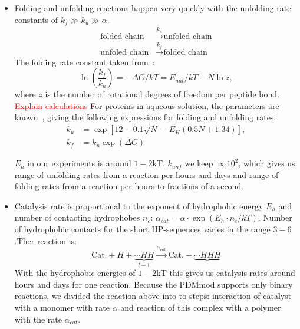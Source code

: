 \documentclass[journal=jacsat,manuscript=article,layout=twocolumn]{achemso}
\newcommand*{\ga}{\alpha}
\newcommand*{\gD}{\Delta}
\newcommand*{\pt}[1]{\left( #1\right)}
\newcommand*{\red}[1]{\textcolor{red}{#1}}
\begin{document}
\begin{itemize}
\item Folding and unfolding reactions happen very quickly with 
the unfolding rate constants of $k_f\gg k_{u}\gg\ga$. 
\begin{equation}
\begin{split}
 \mbox{folded chain}&\xrightarrow{k_u}\mbox{unfoled chain}  \\
 \mbox{unfoled chain}&\xrightarrow{k_f}\mbox{folded chain}
\end{split}
\end{equation}
The folding rate constant taken 
from~\cite{Ghosh2009}:
\begin{equation}
 \ln\pt{\frac{k_f}{k_u}}=-\gD G/kT = E_{nat}/kT-N\ln z,
\end{equation} 
 where $z$ is the number of rotational degrees of freedom per peptide bond. 
 \red{Explain calculations}
For proteins in aqueous solution, the parameters are known~\cite{Ghosh2010,Dill2011}, 
giving the following expressions for folding and unfolding rates:
\begin{equation}
\begin{split}
  k_u &= \exp[12-0.1 \sqrt{N} -E_H(0.5 N + 1.34)],\\
  k_f &= k_u\exp(\gD G)
\end{split}
\end{equation}

$E_h$ in our experiments is around $1-2$kT\red{\cite{?}}. $k_{unf}$ we keep $\propto 10^2$, which 
gives us range of unfolding rates from a reaction per hours and days and range of folding rates 
from a reaction per hours to fractions of a second.

\item Catalysis rate is proportional to the exponent of hydrophobic energy $E_h$ and number of 
contacting hydrophobes $n_c$: $\ga_{cat}=\ga\cdot\exp(E_{h}\cdot n_{c}/kT)$. Number of hydrophobic 
contacts 
for the short HP-sequences varies in the range $3-6$.Ther reaction is:
\begin{equation}
\mbox{Cat.}+H+ \underbrace{\cdots HH}_{l-1} 
\xrightarrow{\ga_{cat}}\mbox{Cat.}+\underbrace{\cdots HHH}
\end{equation}
 With the hydrophobic energies of $1-2$kT this gives us 
catalysis rates around hours and days for one reaction. Because the PDMmod supports only binary 
reactions, we divided the reaction above into to steps: interaction of catalyst with a monomer with 
rate $\ga$ and reaction of this complex with a polymer with the rate $\ga_{cat}$. 

\end{itemize}
\end{document}
